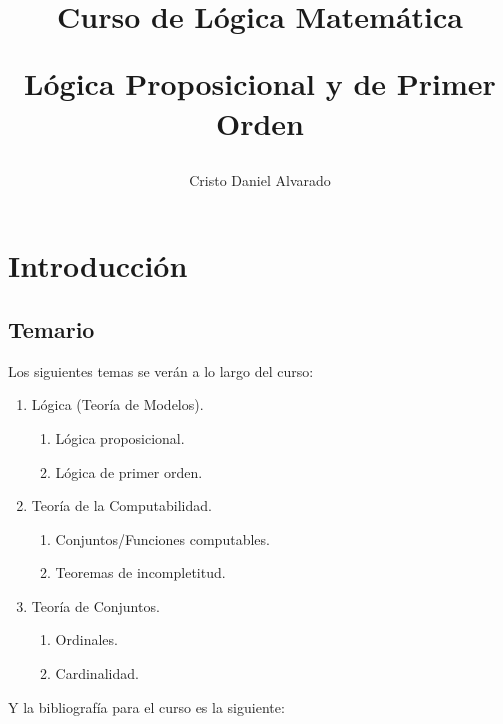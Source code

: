 \documentclass[12pt]{report}
\newcounter{it}
\renewcommand{\theenumii}{\roman{enumii}}
\theoremstyle{largebreak}
\begin{document}
    \title{Curso de Lógica Matemática
    
    Lógica Proposicional y de Primer Orden}
    \author{Cristo Daniel Alvarado}
    \maketitle

    \tableofcontents %

    \setcounter{chapter}{-1} %
    
    \chapter{Introducción}
    
    \section{Temario}
    

    Los siguientes temas se verán a lo largo del curso:

    \renewcommand{\theenumii}{\arabic{enumi}.\arabic{enumii}}

    \begin{enumerate}
        \item Lógica (Teoría de Modelos).
        \begin{enumerate}
            \item Lógica proposicional.
            \item Lógica de primer orden.
        \end{enumerate}
        \item Teoría de la Computabilidad.
        \begin{enumerate}
            \item Conjuntos/Funciones computables.
            \item Teoremas de incompletitud.
        \end{enumerate}
        \item Teoría de Conjuntos.
        \begin{enumerate}
            \item Ordinales.
            \item Cardinalidad.
        \end{enumerate}
    \end{enumerate}

    Y la bibliografía para el curso es la siguiente:
\end{document}
